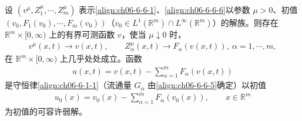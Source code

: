 \documentclass[../../main.tex]{subfiles}
\begin{document}
\begin{theorem}\label{theorem:ch06-6-6-2}
设 $(v^{\mu},Z_{1}^{\mu},\cdots,Z_{m}^{\mu})$ 表示\eqref{align:ch06-6-6-1}、\eqref{align:ch06-6-6-6}以参数 $\mu>0$、初值 $(v_{0},F_{1}(v_{0}),\cdots,F_{m}(v_{0}))$（$v_{0}\in L^{1}(\mathbb{R}^{m})\cap L^{\infty}(\mathbb{R}^{m})$）的解族。则存在 $\mathbb{R}^{m}\times[0,\infty)$ 上的有界可测函数 $v$，使当 $\mu\downarrow 0$ 时，
\begin{align}
v^{\mu}(x,t)\longrightarrow v(x,t),\qquad Z_{\alpha}^{\mu}(x,t)\longrightarrow F_{\alpha}(v(x,t)),\ \alpha=1,\cdots,m,
\label{align:ch06-6-6-19}
\end{align}
在 $\mathbb{R}^{m}\times[0,\infty)$ 上几乎处处成立。函数
\begin{align}
u(x,t)=v(x,t)-\sum_{\alpha=1}^{m}F_{\alpha}(v(x,t))
\label{align:ch06-6-6-20}
\end{align}
是守恒律\eqref{align:ch06-6-1-1}（流通量 $G_{\alpha}$ 由\eqref{align:ch06-6-6-5}确定）以初值
\begin{align}
u_{0}(x)=v_{0}(x)-\sum_{\alpha=1}^{m}F_{\alpha}(v_{0}(x)),\qquad x\in\mathbb{R}^{m}
\label{align:ch06-6-6-21}
\end{align}
为初值的可容许弱解。
\end{theorem}
\end{document}
